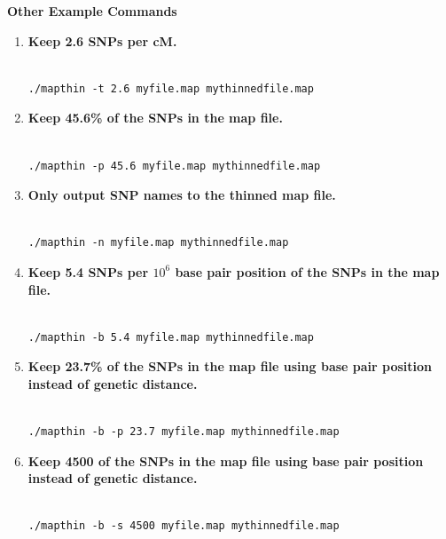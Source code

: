 \documentclass[a4paper,12pt]{article}
\begin{document}
{\bf Other Example Commands} 
\begin{enumerate}

\item {\bf Keep 2.6 SNPs per cM.} \vspace{0.35cm} \begin{lstlisting}

./mapthin -t 2.6 myfile.map mythinnedfile.map

\end{lstlisting} \vspace{0.35cm}
\item {\bf Keep 45.6\% of the SNPs in the map file.} \vspace{0.35cm} \begin{lstlisting}

./mapthin -p 45.6 myfile.map mythinnedfile.map

\end{lstlisting} \vspace{0.35cm}
\item {\bf Only output SNP names to the thinned map file.} \vspace{0.35cm} \begin{lstlisting}

./mapthin -n myfile.map mythinnedfile.map

\end{lstlisting} \vspace{0.35cm}
\item {\bf Keep 5.4 SNPs per $10^6$ base pair position of the SNPs in the map file.} \vspace{0.35cm} \begin{lstlisting}

./mapthin -b 5.4 myfile.map mythinnedfile.map

\end{lstlisting} \vspace{0.35cm}
\item {\bf Keep 23.7\% of the SNPs in the map file using base pair position instead of genetic distance.} \vspace{0.35cm} \begin{lstlisting}

./mapthin -b -p 23.7 myfile.map mythinnedfile.map

\end{lstlisting} \vspace{0.35cm}
\item {\bf Keep 4500 of the SNPs in the map file using base pair position instead of genetic distance.} \vspace{0.35cm} \begin{lstlisting}

./mapthin -b -s 4500 myfile.map mythinnedfile.map

\end{lstlisting} \vspace{0.35cm}\end{enumerate}
\end{document}
